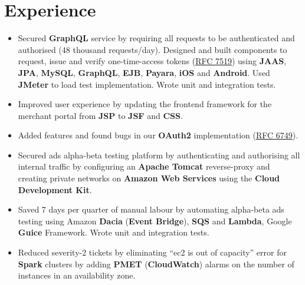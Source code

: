 \section{Experience}

\begin{itemize}[leftmargin=*]
    \item {
        Secured \textbf{GraphQL} service by requiring all requests to be authenticated and authorised (48 thousand requests/day). Designed and built components to request, issue and verify one-time-access tokens (\href{https://datatracker.ietf.org/doc/html/rfc7519}{RFC 7519}) using \textbf{JAAS}, \textbf{JPA}, \textbf{MySQL}, \textbf{GraphQL}, \textbf{EJB}, \textbf{Payara}, \textbf{iOS} and \textbf{Android}. Used \textbf{JMeter} to load test implementation. Wrote unit and integration tests.
    }
    \item {
        Improved user experience by updating the frontend framework for the merchant portal from \textbf{JSP} to \textbf{JSF} and \textbf{CSS}.
    }
    \item {
        Added features and found bugs in our \textbf{OAuth2} implementation (\href{https://datatracker.ietf.org/doc/html/rfc6749}{RFC 6749}).
    }
\end{itemize}


\begin{itemize}[leftmargin=*]
    \item {
        Secured ads alpha-beta testing platform by authenticating and authorising all internal traffic by configuring an \textbf{Apache Tomcat} reverse-proxy and creating private networks on \textbf{Amazon Web Services} using the \textbf{Cloud Development Kit}.
    }
    \item {
        Saved 7 days per quarter of manual labour by automating alpha-beta ads testing using Amazon \textbf{Dacia} (\textbf{Event Bridge}), \textbf{SQS} and \textbf{Lambda}, Google \textbf{Guice} Framework. Wrote unit and integration tests.
    }
    \item {
        Reduced severity-2 tickets by eliminating “ec2 is out of capacity” error for \textbf{Spark} clusters by adding \textbf{PMET} (\textbf{CloudWatch}) alarms on the number of instances in an availability zone.
    }
\end{itemize}


